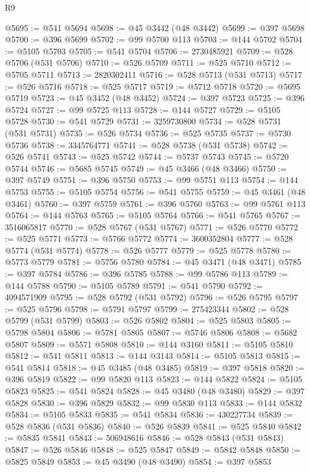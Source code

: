 \begin{lexlean}{R9}
\begin{coremodule}
{{{{{{{{{{{{{{{{{{{{{{{{{{{{{{{{{{{{{{{{{{{{{{{{{{{{{{{{{{{{{{{{{{{{{{{{{{{{{{{{{{{{@5695 := @541 @5694
@5698 := @45 @3442 (@48 @3442)
@5699 := @397 @5698
@5700 := @396 @5699
@5702 := @99 @5700 @113
@5703 := @144 @5702
@5704 := @5105 @5703
@5705 := @541 @5704
@5706 := 2730485921
@5709 := @528 @5706 (@531 @5706)
@5710 := @526 @5709
@5711 := @525 @5710
@5712 := @5705 @5711
@5713 := 2820302411
@5716 := @528 @5713 (@531 @5713)
@5717 := @526 @5716
@5718 := @525 @5717
@5719 := @5712 @5718
@5720 := @5695 @5719
@5723 := @45 @3452 (@48 @3452)
@5724 := @397 @5723
@5725 := @396 @5724
@5727 := @99 @5725 @113
@5728 := @144 @5727
@5729 := @5105 @5728
@5730 := @541 @5729
@5731 := 3259730800
@5734 := @528 @5731 (@531 @5731)
@5735 := @526 @5734
@5736 := @525 @5735
@5737 := @5730 @5736
@5738 := 3345764771
@5741 := @528 @5738 (@531 @5738)
@5742 := @526 @5741
@5743 := @525 @5742
@5744 := @5737 @5743
@5745 := @5720 @5744
@5746 := @5685 @5745
@5749 := @45 @3466 (@48 @3466)
@5750 := @397 @5749
@5751 := @396 @5750
@5753 := @99 @5751 @113
@5754 := @144 @5753
@5755 := @5105 @5754
@5756 := @541 @5755
@5759 := @45 @3461 (@48 @3461)
@5760 := @397 @5759
@5761 := @396 @5760
@5763 := @99 @5761 @113
@5764 := @144 @5763
@5765 := @5105 @5764
@5766 := @541 @5765
@5767 := 3516065817
@5770 := @528 @5767 (@531 @5767)
@5771 := @526 @5770
@5772 := @525 @5771
@5773 := @5766 @5772
@5774 := 3600352804
@5777 := @528 @5774 (@531 @5774)
@5778 := @526 @5777
@5779 := @525 @5778
@5780 := @5773 @5779
@5781 := @5756 @5780
@5784 := @45 @3471 (@48 @3471)
@5785 := @397 @5784
@5786 := @396 @5785
@5788 := @99 @5786 @113
@5789 := @144 @5788
@5790 := @5105 @5789
@5791 := @541 @5790
@5792 := 4094571909
@5795 := @528 @5792 (@531 @5792)
@5796 := @526 @5795
@5797 := @525 @5796
@5798 := @5791 @5797
@5799 := 275423344
@5802 := @528 @5799 (@531 @5799)
@5803 := @526 @5802
@5804 := @525 @5803
@5805 := @5798 @5804
@5806 := @5781 @5805
@5807 := @5746 @5806
@5808 := @5682 @5807
@5809 := @5571 @5808
@5810 := @144 @3160
@5811 := @5105 @5810
@5812 := @541 @5811
@5813 := @144 @3143
@5814 := @5105 @5813
@5815 := @541 @5814
@5818 := @45 @3485 (@48 @3485)
@5819 := @397 @5818
@5820 := @396 @5819
@5822 := @99 @5820 @113
@5823 := @144 @5822
@5824 := @5105 @5823
@5825 := @541 @5824
@5828 := @45 @3480 (@48 @3480)
@5829 := @397 @5828
@5830 := @396 @5829
@5832 := @99 @5830 @113
@5833 := @144 @5832
@5834 := @5105 @5833
@5835 := @541 @5834
@5836 := 430227734
@5839 := @528 @5836 (@531 @5836)
@5840 := @526 @5839
@5841 := @525 @5840
@5842 := @5835 @5841
@5843 := 506948616
@5846 := @528 @5843 (@531 @5843)
@5847 := @526 @5846
@5848 := @525 @5847
@5849 := @5842 @5848
@5850 := @5825 @5849
@5853 := @45 @3490 (@48 @3490)
@5854 := @397 @5853
}}}}}}}}}}}}}}}}}}}}}}}}}}}}}}}}}}}}}}}}}}}}}}}}}}}}}}}}}}}}}}}}}}}}}}}}}}}}}}}}}}}}
\end{coremodule}
\end{lexlean}
